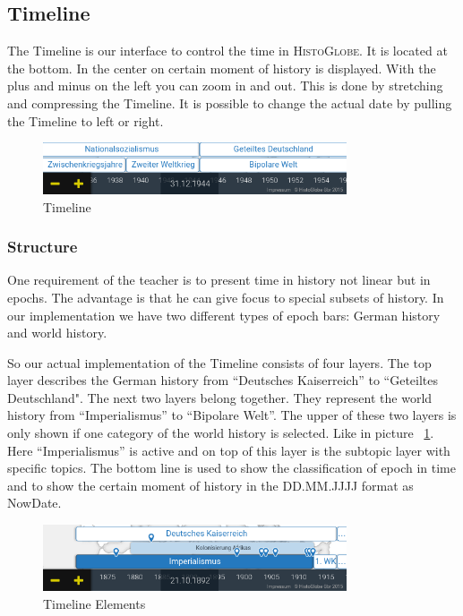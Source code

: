 \subsection{Timeline} %
\label{sub:timeline}

The Timeline is our interface to control the time in \textsc{HistoGlobe}. It is located at the bottom. In the center on certain moment of history is displayed. With the plus and minus on the left you can zoom in and out. This is done by stretching and compressing the Timeline. It is possible to change the actual date by pulling the Timeline to left or right.

\begin{figure}[H]
	\centering
	\includegraphics[width=0.8\textwidth]{graphics/timeline_now.png}
	\caption{Timeline}
\end{figure}

\subsubsection{Structure}
One requirement of the teacher is to present time in history not linear but in epochs. The advantage is that he can give focus to special subsets of history. In our implementation we have two different types of epoch bars: German history and world history.

So our actual implementation of the Timeline consists of four layers. The top layer describes the German history from ``Deutsches Kaiserreich'' to ``Geteiltes Deutschland". The next two layers belong together. They represent the world history from ``Imperialismus'' to ``Bipolare Welt''. The upper of these two layers is only shown if one category of the world history is selected. Like in picture ~\ref{fig:Timeline_Elements}. Here ``Imperialismus'' is active and on top of this layer is the subtopic layer with specific topics. The bottom line is used to show the classification of epoch in time and to show the certain moment of history in the DD.MM.JJJJ format as NowDate.

\begin{figure}[H]
	\centering
	\includegraphics[width=0.8\textwidth]{graphics/timeline_elements.png}
	\caption{Timeline Elements}
	\label{fig:Timeline_Elements}
\end{figure}



